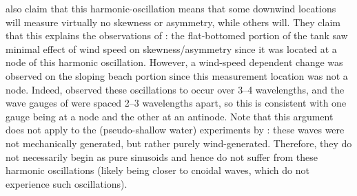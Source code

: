 \documentclass{jfm}
\begin{document}
 also claim that this harmonic-oscillation
means that some downwind locations will measure virtually no skewness
or asymmetry, while others will.
They claim that this explains the observations of
\citet{feddersen2005wind}: the flat-bottomed portion of the tank saw
minimal effect of wind speed on skewness/asymmetry since it was located
at a node of this harmonic oscillation.
However, a wind-speed dependent change was observed on the sloping beach
portion since this measurement location was not a node.
Indeed, \citet{chapalain1992observed,liu2016modeling} observed these
oscillations to occur over \numrange{3}{4} wavelengths, and the
wave gauges of \citet{feddersen2005wind} were spaced \numrange{2}{3}
wavelengths apart, so this is consistent with one gauge being at a node
and the other at an antinode.
Note that this argument does not apply to the (pseudo-shallow water)
experiments by \citet{leykin1995asymmetry}: these waves were not
mechanically generated, but rather purely wind-generated.
Therefore, they do not necessarily begin as pure sinusoids and hence do
not suffer from these harmonic oscillations (likely being closer to
cnoidal waves, which do not experience such oscillations).
\end{document}
